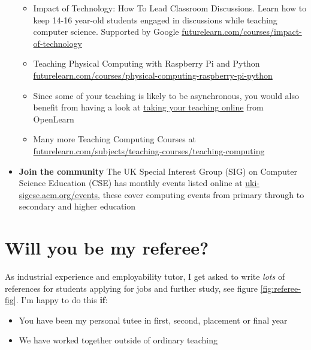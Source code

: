 \documentclass[
  12pt,
]{book}
\providecommand{\tightlist}{%
  \setlength{\itemsep}{0pt}\setlength{\parskip}{0pt}}
\begin{document}
\begin{itemize}
  \begin{itemize}
  \tightlist
  \item
    Impact of Technology: How To Lead Classroom Discussions. Learn how to keep 14-16 year-old students engaged in discussions while teaching computer science. Supported by Google \href{https://www.futurelearn.com/courses/impact-of-technology}{futurelearn.com/courses/impact-of-technology}
  \item
    Teaching Physical Computing with Raspberry Pi and Python \href{https://www.futurelearn.com/courses/physical-computing-raspberry-pi-python}{futurelearn.com/courses/physical-computing-raspberry-pi-python}
  \item
    Since some of your teaching is likely to be asynchronous, you would also benefit from having a look at \href{https://www.open.edu/openlearn/education-development/education/take-your-teaching-online/content-section-overview}{taking your teaching online} from OpenLearn
  \item
    Many more Teaching Computing Courses at \href{https://www.futurelearn.com/subjects/teaching-courses/teaching-computing}{futurelearn.com/subjects/teaching-courses/teaching-computing}
  \end{itemize}
\item
  \textbf{Join the community} The UK Special Interest Group (SIG) on Computer Science Education (CSE) has monthly events listed online at \href{https://uki-sigcse.acm.org/events}{uki-sigcse.acm.org/events}, these cover computing events from primary through to secondary and higher education
\end{itemize}

\hypertarget{referee}{%
\chapter{Will you be my referee?}\label{referee}}

As industrial experience and employability tutor, I get asked to write \emph{lots} of references for students applying for jobs and further study, see figure \ref{fig:referee-fig}. I'm happy to do this \textbf{if}:

\begin{itemize}
\tightlist
\item
  You have been my personal tutee in first, second, placement or final year
\item
  We have worked together outside of ordinary teaching
\end{itemize}
\end{document}
